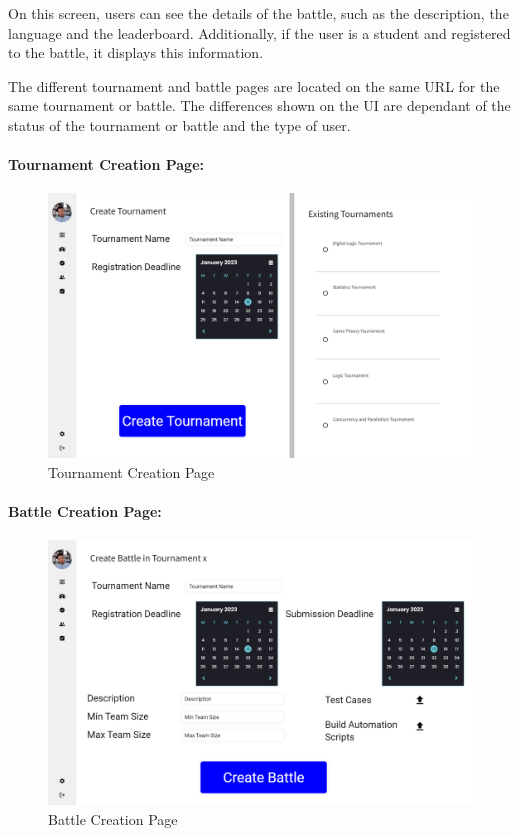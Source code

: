 \documentclass{article}
\begin{document}
On this screen, users can see the details of the battle, such as the description, the
language and the leaderboard. Additionally, if the user is a student and registered to the battle,
it displays this information.

The different tournament and battle pages are located on the same URL for the same tournament or battle.
The differences shown on the UI are dependant of the status of the tournament or battle and the type of user.

\paragraph{Tournament Creation Page:}

\begin{figure}[H]
    \centering
    \includegraphics[width=1\textwidth]{images/UI/Create Tournament.png}
    \caption{Tournament Creation Page}
    \label{fig:TournamentCreationPage}
\end{figure}

\paragraph{Battle Creation Page:}

\begin{figure}[H]
    \centering
    \includegraphics[width=1\textwidth]{images/UI/Create Battle.png}
    \caption{Battle Creation Page}
    \label{fig:BattleCreationPage}
\end{figure}
\end{document}
